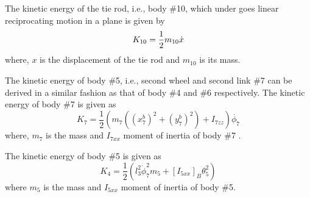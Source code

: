 {The kinetic energy of the tie rod, i.e., body \#10, which under goes linear reciprocating motion in a plane is given by
\begin{equation}
K_{10}=\frac{1}{2} m_{10} \dot{x}
\end{equation} where, $x$ is the displacement of the tie rod and $m_{10}$ is its mass.


The kinetic energy of body \#5, i.e., second wheel and second link \#7 can be derived in a similar fashion as that of body \#4 and \#6 respectively. The kinetic energy of body \#7 is given as
\begin{equation}
K_7=\frac{1}{2}(m_7((x^b_7)^2+(y^b_7)^2)+I_{7zz})\dot{\phi_7}
\end{equation}
where, $m_7$ is the mass and  $I_{7xx}$ moment of inertia of body \#7 .

The kinetic energy of body \#5  is given as
 \begin{equation}
K_4=\frac{1}{2}(l_3^2\dot\phi_7^2m_5+[I_{5xx}]_B\theta_5^2)
\end{equation} 
 where $m_5$  is the mass and $I_{5xx}$ moment of inertia of body \#5.
 

}
